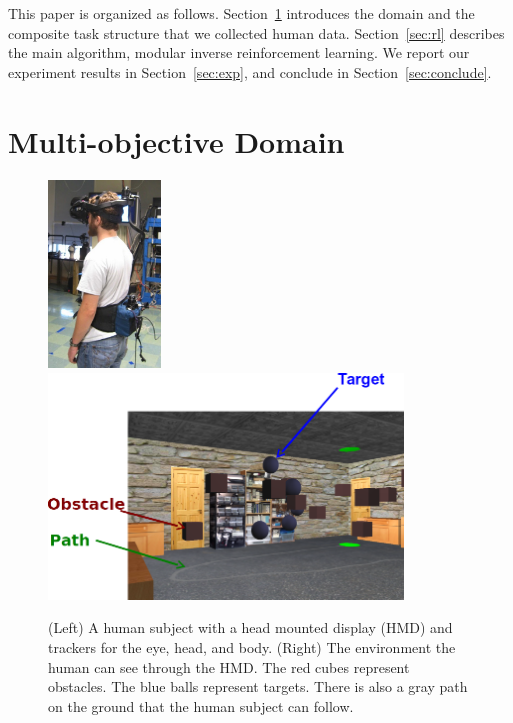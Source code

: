 \documentclass[11pt]{article} %
\begin{document}
This paper is organized as follows. Section~\ref{sec:domain} introduces the
domain and the composite task structure that we collected human data. Section~\ref{sec:rl}
describes the main algorithm, modular inverse reinforcement learning. We report
our experiment results in Section~\ref{sec:exp}, and conclude in
Section~\ref{sec:conclude}.

\section{Multi-objective Domain}
\label{sec:domain}

\begin{figure}
\centering
\includegraphics[height=5cm]{human.jpg}
\includegraphics[height=6cm]{env.png}
\caption{(Left) A human subject with a head mounted display (HMD) and trackers
for the eye, head, and body.  (Right) The environment the human can see through
the HMD.  The red cubes represent obstacles. The blue balls represent targets.
There is also a gray path on the ground that the human subject can follow.}
\label{fig:avatar}
\end{figure}
\end{document}
